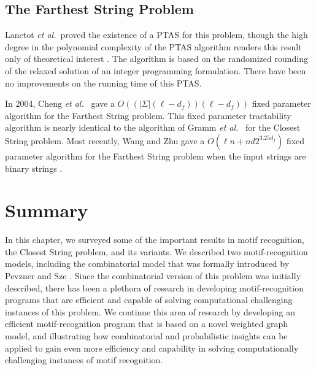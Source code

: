 \subsection{The {\sc Farthest String} Problem}

Lanctot {\em et al.}\ proved the existence of a PTAS for this problem, though the high degree in the polynomial complexity of the PTAS algorithm renders this result only of theoretical interest \cite{LLMWZ00}.  The algorithm is based on the randomized rounding of the relaxed solution of an integer programming formulation.  There have been no improvements on the running time of this PTAS. 

In 2004, Cheng {\em et al.}\ \cite{cheng} gave a $O((|\Sigma|(\ell-d_f)) (\ell-d_f))$ fixed parameter algorithm for the {\sc Farthest String} problem. This fixed parameter tractability algorithm is nearly identical to the algorithm of Gramm {\em et al.}\ \cite{GNR03} for the {\sc Closest String} problem. Most recently, Wang and Zhu gave a $O(\ell n+n d 2^{3.25d_f})$ fixed parameter algorithm for the {\sc Farthest String} problem when the input strings are binary strings \cite{WZ}. 

\section{Summary}

In this chapter, we surveyed some of the important results in motif recognition, the {\sc Closest String} problem, and its variants.  We described two motif-recognition models, including the combinatorial model that was formally introduced by Pevzner and Sze \cite{PS00}.  Since the combinatorial version of this problem was initially described, there has been a plethora of research in developing motif-recognition programs that are efficient and capable of solving computational challenging instances of this problem.  We continue this area of research by developing  an efficient motif-recognition program that is based on a novel weighted graph model, and illustrating how combinatorial and probabilistic insights can be applied to gain even more efficiency and capability in solving computationally challenging instances of motif recognition. 